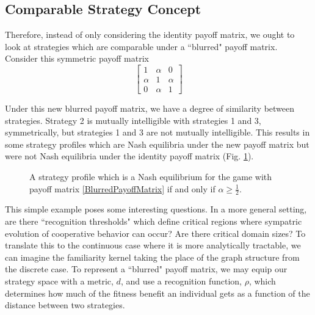 \documentclass[]{article}
\begin{document}
		\subsection{Comparable Strategy Concept}\label{comparablestrategyconcept}	
		Therefore, instead of only considering the identity payoff matrix, we ought to look at strategies which are comparable under a ``blurred" payoff matrix. Consider this symmetric payoff matrix
		\begin{equation}\label{BlurredPayoffMatrix}
			\begin{bmatrix}
				1&\alpha&0\\
				\alpha&1&\alpha\\
				0&\alpha&1
			\end{bmatrix}
		\end{equation}
		
		Under this new blurred payoff matrix, we have a degree of similarity between strategies. Strategy 2 is mutually intelligible with strategies 1 and 3, symmetrically, but strategies 1 and 3 are not mutually intelligible. This results in some strategy profiles which are Nash equilibria under the new payoff matrix but were not Nash equilibria under the identity payoff matrix (Fig. \ref{BlurredNE}).   
	
		\begin{figure} [h!]
			\centering
			\caption{A strategy profile which is a Nash equilibrium for the game with payoff matrix \eqref{BlurredPayoffMatrix} if and only if $\alpha\geq \frac{1}{2}$.}
			\label{BlurredNE}
		\end{figure}
		This simple example poses some interesting questions. In a more general setting, are there ``recognition thresholds" which define critical regions where sympatric evolution of cooperative behavior can occur? Are there critical domain sizes? To translate this to the continuous case where it is more analytically tractable, we can imagine the familiarity kernel taking the place of the graph structure from the discrete case. To represent a ``blurred" payoff matrix, we may equip our strategy space with a metric, $d$, and use a recognition function, $\rho$, which determines how much of the fitness benefit an individual gets as a function of the distance between two strategies.   
	
\end{document}
